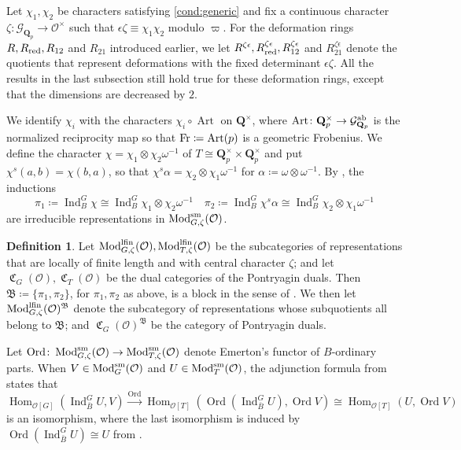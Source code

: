 \documentclass[leqno]{amsart}
\theoremstyle{definition}
\newtheorem{defn}[thm]{Definition}
\theoremstyle{remark}
\newcommand{\oo}{\mathcal{O}}
\newcommand{\Q}{{\mathbf{Q}}}
\newcommand{\Qp}{\mathbf{Q}_p}
\DeclareMathOperator{\Hom}{Hom}
\DeclareMathOperator{\Ind}{Ind}
\DeclareMathOperator{\Art}{Art}
\newcommand{\Fr}{\textnormal{Fr}} %
\DeclareMathOperator{\Mod}{\textnormal{Mod}}
\DeclareMathOperator{\fC}{\mathfrak{C}} %
\DeclareMathOperator{\Ord}{Ord} %
\newcommand{\Gp}{\mathcal{G}_{\Qp}} %
\newcommand{\B}{\mathfrak B} %
\newcommand{\sm}{\textnormal{sm}}
\newcommand{\lfin}{\textnormal{lfin}}
\newcommand{\red}{\textnormal{red}}
\begin{document}
Let $\chi_1,\chi_2$ be characters satisfying
\eqref{cond:generic} and fix a continuous character 
$\zeta\colon \Gp\to \oo^\times$
such that $\epsilon\zeta\equiv \chi_1\chi_2$ 
modulo $\varpi$.
For the deformation rings
$R, R_{\red}, R_{12}$ and $R_{21}$
introduced earlier, we let 
$R^{\zeta\epsilon}, R^{\zeta\epsilon}_{\red}, 
R^{\zeta\epsilon}_{12}$ and $R^{\zeta\epsilon}_{21}$
denote the quotients that represent
deformations with the
fixed determinant $\epsilon\zeta$.
All the results in the last subsection
still hold true for these deformation rings,
except that the dimensions are decreased by $2$.

We identify $\chi_i$ with the characters
$\chi_i\circ \Art$ on $\Q^\times$,
where $\Art\colon \Qp^\times\to \Gp^{\textnormal{ab}}$
is the normalized reciprocity map
so that $\Fr\coloneqq \Art(p)$
is a geometric Frobenius.
We define the character
$\chi=\chi_1\otimes\chi_2\omega^{-1}$
of $T\cong \Qp^\times\times\Qp^\times$
and put $\chi^s(a,b)=\chi(b,a)$, so that 
$\chi^s\alpha=\chi_2\otimes \chi_1\omega^{-1}$
for $\alpha\coloneqq \omega\otimes\omega^{-1}$.
By \cite[Thm 30]{barthel},
the inductions
\[
\pi_1\coloneqq \Ind_{B}^G\chi\cong
\Ind_{B}^G\chi_1\otimes\chi_2\omega^{-1}\quad
\pi_2\coloneqq \Ind_{B}^G\chi^s\alpha\cong 
\Ind_{B}^G\chi_2\otimes\chi_1\omega^{-1} 
\]
are irreducible representations
in $\Mod^{\sm}_{G,\zeta}(\oo)$.

\begin{defn}\label{def:block}
Let $\Mod^{\lfin}_{G,\zeta}(\oo), \Mod^{\lfin}_{T,\zeta}(\oo)$
be the subcategories
of representations that are 
locally of finite length 
and with central character $\zeta$;
and let $\fC_G(\oo), \fC_T(\oo)$
be the dual categories
of the Pontryagin duals.
Then $\B\coloneqq\{\pi_1,\pi_2\}$,
for $\pi_1,\pi_2$ as above, is a block 
in the sense of \cite[\S 5]{pask}.
We then let $\Mod^{\lfin}_{G,\zeta}(\oo)^\B$
denote the subcategory
of representations whose subquotients
all belong to $\B$;
and $\fC_G(\oo)^\B$
be the category of Pontryagin duals.
\end{defn}

Let $\Ord\colon \Mod_{G,\zeta}^{\sm}(\oo)
\to \Mod_{T,\zeta}^{\sm}(\oo)$
denote Emerton's functor of $B$-ordinary parts.
When $V\in \Mod^{\sm}_G(\oo)$ and
$U\in \Mod^{\sm}_T(\oo)$,
the adjunction formula
from \cite[Thm 4.4.6]{emeI} states that
\begin{equation}\label{eq:adjunct}
	\Hom_{\oo[G]}(\Ind_{\bar{B}}^GU,V)
	\xrightarrow{\Ord}
	\Hom_{\oo[T]}(\Ord(\Ind_{\bar{B}}^GU),\Ord V)
	\cong
	\Hom_{\oo[T]}(U,\Ord V)
\end{equation}
is an isomorphism, where the last isomorphism
is induced by $\Ord(\Ind_{\bar{B}}^GU)\cong U$
from  \cite[Prop 4.3.4]{emeI}.
\end{document}
